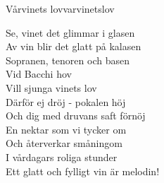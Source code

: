 \begin{song}{Vårvinets lov}{varvinetslov}

\begin{vers}
Se, vinet det glimmar i glasen\\
Av vin blir det glatt på kalasen\\
Sopranen, tenoren och basen\\
Vid Bacchi hov\\
Vill sjunga vinets lov\\
Därför ej dröj - pokalen höj\\
Och dig med druvans saft förnöj\\
En nektar som vi tycker om\\
Och återverkar småningom\\
I vårdagars roliga stunder\\
Ett glatt och fylligt vin är melodin!\\
\end{vers}
\end{song}
